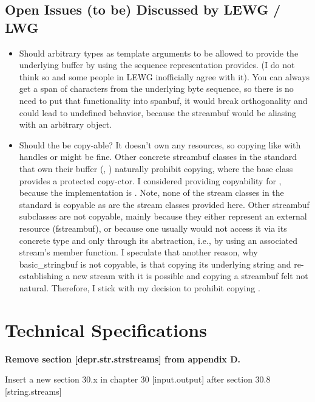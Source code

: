 \documentclass[ebook,11pt,article]{memoir}
\begin{document}
\section{Open Issues (to be) Discussed by LEWG / LWG}
\begin{itemize}
\item Should arbitrary types as template arguments to  be allowed to provide the underlying buffer by using the  sequence representation  provides. (I do not think so and some people in LEWG inofficially agree with it). You can always get a span of characters from the underlying byte sequence, so there is no need to put that functionality into spanbuf, it would break orthogonality and could lead to undefined behavior, because the streambuf would be aliasing with an arbitrary object.
\item Should the  be copy-able? It doesn't own any resources, so copying like with handles or  might be fine. Other concrete streambuf classes in the standard that own their buffer (, ) naturally prohibit copying, where the base class  provides a protected copy-ctor. I considered providing copyability for , because the implementation is . Note, none of the stream classes in the standard is copyable as are the stream classes provided here. Other streambuf subclasses are not copyable, mainly because they either represent an external resource (fstreambuf), or because one usually would not access it via its concrete type and only through its  abstraction, i.e., by using an associated stream's  member function. I speculate that another reason, why basic_stringbuf is not copyable, is that copying its underlying string and re-establishing a new stream with it is possible and copying a streambuf felt not natural. Therefore, I stick with my decision to prohibit copying .
\end{itemize}

\chapter{Technical Specifications}

\textbf{Remove section [depr.str.strstreams] from appendix D.
}

Insert a new section 30.x in chapter 30 [input.output] after section 30.8 [string.streams]
\end{document}
